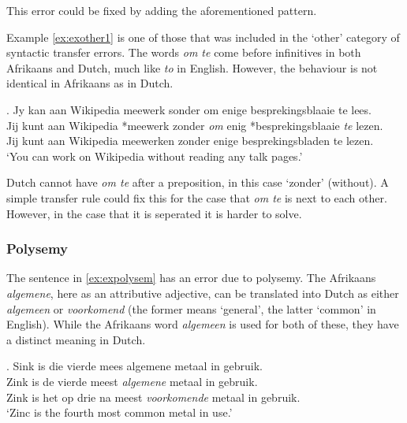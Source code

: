 \documentclass[11pt]{article}
\begin{document}
This error could be fixed by adding the aforementioned pattern.

Example \ref{ex:exother1} is one of those that was included in the `other' category of syntactic
transfer errors. The words \emph{om te} come before infinitives in both Afrikaans and Dutch, much like
\emph{to} in English. However, the behaviour is not identical in Afrikaans as in Dutch.

\ex. \label{ex:exother1}
    Jy kan aan Wikipedia meewerk sonder om enige besprekingsblaaie te lees. \\
    Jij kunt aan Wikipedia *meewerk zonder {\em om} enig *besprekingsblaaie {\em te} lezen. \\
    Jij kunt aan Wikipedia meewerken zonder enige besprekingsbladen te lezen. \\
    `You can work on Wikipedia without reading any talk pages.'

Dutch cannot have \emph{om te} after a preposition, in this case `zonder' (without). A simple transfer rule could fix this
for the case that \emph{om te} is next to each other. However, in the case that it is seperated it is harder to solve.
%

\subsubsection{Polysemy}

The sentence in \ref{ex:expolysem} has an error due to polysemy. The Afrikaans {\em algemene}, here as
an attributive adjective, can be translated into Dutch as either {\em algemeen} or {\em voorkomend} 
(the former means `general', the latter `common' in English). While the Afrikaans word {\em algemeen} is used
for both of these, they have a distinct meaning in Dutch.

\ex. \label{ex:expolysem} 
    Sink is die vierde mees algemene metaal in gebruik. \\
    Zink is de vierde meest {\em algemene} metaal in gebruik. \\
    Zink is het op drie na meest {\em voorkomende} metaal in gebruik. \\
    `Zinc is the fourth most common metal in use.' 
\end{document}
